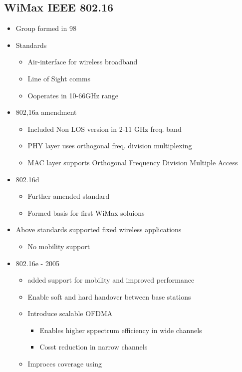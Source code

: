 \subsection{WiMax IEEE 802.16}
\begin{itemize}
	\item Group formed in 98
	\item Standards
	\begin{itemize}
		\item Air-interface for wireless broadband
		\item Line of Sight comms
		\item Ooperates in 10-66GHz range
	\end{itemize}
	\item 802,16a amendment
	\begin{itemize}
		\item Included Non LOS version in 2-11 GHz freq. band
		\item PHY layer uses orthogonal freq. division multiplexing
		\item MAC layer supports Orthogonal Frequency Division Multiple
			Access
	\end{itemize}
	\item 802.16d
	\begin{itemize}
		\item Further amended standard
		\item Formed basis for first WiMax soluions
	\end{itemize}
        \item Above standards supported fixed wireless applications
	\begin{itemize}
		\item No mobility support
	\end{itemize}
	\item 802.16e - 2005
	\begin{itemize}
		\item added support for mobility and improved performance
		\item Enable soft and hard handover between base stations
		\item Introduce scalable OFDMA
		\begin{itemize}
			\item Enables higher sppectrum efficiency in wide
				channels
			\item Cosst reduction in narrow channels
		\end{itemize}
		\item Improces coverage using
		\begin{itemize}

\end{itemize}
\end{itemize}
\end{itemize}
